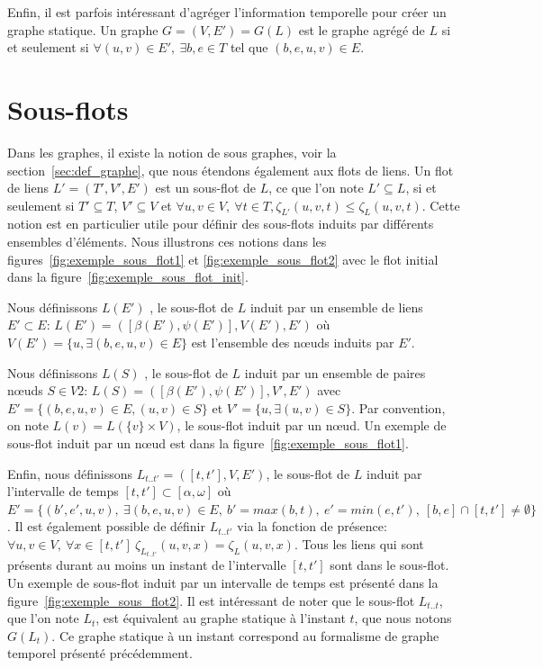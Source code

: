 Enfin, il est parfois intéressant d'agréger l'information temporelle pour créer un graphe statique.
Un graphe $G=(V,E')=G(L)$ est le graphe agrégé de $L$ si et seulement si $\forall (u,v) \in E',\ \exists b,e \in T$ tel que $(b,e,u,v) \in E$.




\section{Sous-flots}
Dans les graphes, il existe la notion de sous graphes, voir la section~\ref{sec:def_graphe}, que nous étendons également aux flots de liens.
Un flot de liens $L'=(T',V',E')$ est un sous-flot de $L$, ce que l'on note $L' \subseteq L$, si et seulement si $T'\subseteq T$, $V'\subseteq V$ et  $\forall u,v \in V,\ \forall t\in T, \zeta_{L'}(u,v,t) \leq \zeta_{L}(u,v,t)$.
Cette notion est en particulier utile pour définir des sous-flots induits par différents ensembles d'éléments.
Nous illustrons ces notions dans les figures~\ref{fig:exemple_sous_flot1} et \ref{fig:exemple_sous_flot2} avec le flot initial dans la figure~\ref{fig:exemple_sous_flot_init}.
 
Nous définissons $L(E')$ , le sous-flot de $L$ induit par un ensemble de liens $E' \subset E$: $L(E')=([\beta(E'),\psi(E')],V(E'),E')$ où $V(E')=\{u, \exists (b,e,u,v) \in E\}$ est l'ensemble des n\oe uds induits par $E'$.

 
Nous définissons $L(S)$ , le sous-flot de $L$ induit par un ensemble de paires n\oe uds $S \in V2$: $L(S)=([\beta(E'),\psi(E')],V',E')$ avec $E'= \{(b,e,u,v) \in E, (u,v) \in S\}$ et $V'=\{u, \exists (u,v) \in S\}$.
Par convention, on note $L(v)= L(\{v\}\times V)$, le sous-flot induit par un n\oe ud.
Un exemple de sous-flot induit par un n\oe ud est dans la figure~\ref{fig:exemple_sous_flot1}.


Enfin, nous définissons $L_{t..t'}=([t, t'], V,E')$, le sous-flot de $L$ induit par l'intervalle de temps $[t,t'] \subset [\alpha, \omega]$ où $E'= \{(b',e',u,v),\ \exists (b,e,u,v) \in E,\ b'= max(b,t),\ e'=min(e,t'),\ [b,e]\cap [t,t']\neq \emptyset\}$.
Il est également possible de définir $L_{t..t'}$ via la fonction de présence: $\forall u,v \in V,\ \forall x \in [t,t']\  \zeta_{L_{t..t'}}(u,v,x) = \zeta_{L}(u,v,x)$.
Tous les liens qui sont présents durant au moins un instant de l'intervalle $[t, t']$ sont dans le sous-flot.
Un exemple de sous-flot induit par un intervalle de temps est présenté dans la figure~\ref{fig:exemple_sous_flot2}.
Il est intéressant de noter que le sous-flot $L_{t..t}$, que l'on note $L_t$, est équivalent au graphe statique à l'instant $t$,  que nous notons $G(L_t)$.
Ce graphe statique à un instant correspond au formalisme de graphe temporel présenté précédemment.


